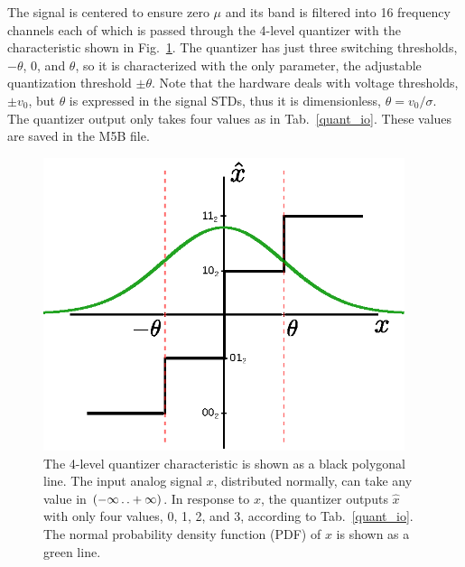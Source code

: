 \documentclass[letterpaper,twoside,12pt]{article}
\newcommand{\twodots}{\mathinner {\ldotp \ldotp}}
\begin{document}
The signal is centered to ensure zero $\mu$ and its band is filtered into 16 frequency channels each of which is passed through the 4-level quantizer with the characteristic shown in Fig.~\ref{quant4lvl}.  The quantizer has just three switching thresholds, $-\theta$, 0, and $\theta$, so it is characterized with the only parameter, the adjustable quantization threshold $\pm\theta$. Note that the hardware deals with voltage thresholds, $\pm v_0$, but $\theta$ is expressed in the signal STDs, thus it is dimensionless, $\theta = v_0/\sigma$. The quantizer output only takes four values as in Tab.~\ref{quant_io}. These values are saved in the M5B file.


\begin{figure}[ht!]
  \begin{center}
  \includegraphics[width=25pc]{fig_4_Level_Quantization_Pattern_impr.eps}
  \caption{\small The 4-level quantizer characteristic is shown as a black polygonal line. The input analog signal $x$, distributed normally, can take any value in $(-\infty \twodots +\infty)$. In response to $x$, the quantizer outputs $\hat{x}$ with only four values, 0, 1, 2, and 3, according to Tab.~\ref{quant_io}. The normal probability density function (PDF) of $x$ is shown as a green line.}
  \label{quant4lvl}
  \end{center}
\end{figure}
\end{document}
